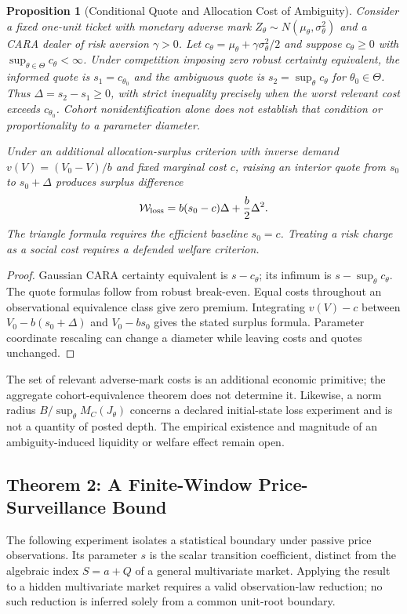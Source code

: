 \documentclass[12pt]{article}
\newtheorem{proposition}[theorem]{Proposition}
\theoremstyle{definition}
\theoremstyle{remark}
\begin{document}
\begin{proposition}[Conditional Quote and Allocation Cost of Ambiguity]
\label{thm:welfare_opacity}
Consider a fixed one-unit ticket with monetary adverse mark $Z_\theta\sim N(\mu_\theta,\sigma_\theta^2)$ and a CARA dealer of risk aversion $\gamma>0$. Let $c_\theta=\mu_\theta+\gamma\sigma_\theta^2/2$ and suppose $c_\theta\ge0$ with $\sup_{\theta\in\Theta}c_\theta<\infty$. Under competition imposing zero robust certainty equivalent, the informed quote is $s_1=c_{\theta_0}$ and the ambiguous quote is $s_2=\sup_\theta c_\theta$ for $\theta_0\in\Theta$. Thus $\Delta=s_2-s_1\ge0$, with strict inequality precisely when the worst relevant cost exceeds $c_{\theta_0}$. Cohort nonidentification alone does not establish that condition or proportionality to a parameter diameter.

Under an additional allocation-surplus criterion with inverse demand $v(V)=(V_0-V)/b$ and fixed marginal cost $c$, raising an interior quote from $s_0$ to $s_0+\Delta$ produces surplus difference
\[
\mathcal W_{\rm loss}=b(s_0-c)\Delta+\frac b2\Delta^2.
\]
The triangle formula requires the efficient baseline $s_0=c$. Treating a risk charge as a social cost requires a defended welfare criterion.
\end{proposition}
\begin{proof}
Gaussian CARA certainty equivalent is $s-c_\theta$; its infimum is $s-\sup_\theta c_\theta$. The quote formulas follow from robust break-even. Equal costs throughout an observational equivalence class give zero premium. Integrating $v(V)-c$ between $V_0-b(s_0+\Delta)$ and $V_0-bs_0$ gives the stated surplus formula. Parameter coordinate rescaling can change a diameter while leaving costs and quotes unchanged.
\end{proof}

The set of relevant adverse-mark costs is an additional economic primitive; the aggregate cohort-equivalence theorem does not determine it. Likewise, a norm radius $B/\sup_\theta M_C(J_\theta)$ concerns a declared initial-state loss experiment and is not a quantity of posted depth. The empirical existence and magnitude of an ambiguity-induced liquidity or welfare effect remain open.


\subsection{Theorem 2: A Finite-Window Price-Surveillance Bound}
The following experiment isolates a statistical boundary under passive price observations. Its parameter $s$ is the scalar transition coefficient, distinct from the algebraic index $S=a+Q$ of a general multivariate market. Applying the result to a hidden multivariate market requires a valid observation-law reduction; no such reduction is inferred solely from a common unit-root boundary.
\end{document}
